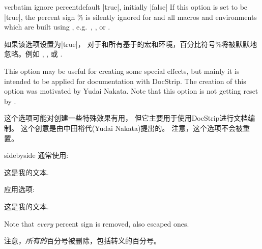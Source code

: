 \begin{docTcbKey}[][doc new=2017-07-05]{verbatim ignore percent}{}{default |true|, initially |false|}
If this option is set to be |true|, the percent sign \% is silently
ignored for  and all macros and environments
which are built using , e.g.\ 
, , or .\par
如果该选项设置为|true|，%
对于和所有基于的宏和环境，百分比符号\%将被默默地忽略。例如 , , 或 .\par


This option may be useful for creating some special effects, but mainly
it is intended to be applied for documentation with DocStrip.
The creation of this option was motivated by Yudai Nakata.
Note that this option is not getting reset by .

这个选项可能对创建一些特殊效果有用，%
但它主要用于使用DocStrip进行文档编制。%
这个创意是由中田裕代(Yudai Nakata)提出的。%
注意，这个选项不会被重置。

\begin{dispExample*}{sidebyside}
通常使用:
\begin{tcbwritetemp}
这是我的文本.
\end{tcbwritetemp}

\tcbusetemp

\bigskip 应用选项:
\begin{tcbwritetemp}
这是我的文本.
\end{tcbwritetemp}

\tcbusetemp
\end{dispExample*}

\begin{marker}

Note that \emph{every} percent sign is removed, also escaped ones.

注意，\emph{所有的}百分号被删除，包括转义的百分号。


\end{marker}
\end{docTcbKey}
